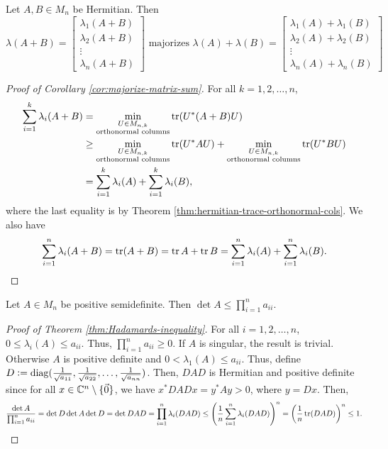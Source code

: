 \begin{corollary}
\label{cor:majorize-matrix-sum}
Let $A, B \in M_n$ be Hermitian. Then $$\lambda(A+B) = \begin{bmatrix}\lambda_1(A+B) \\ \lambda_2(A+B) \\ \vdots \\ \lambda_n(A+B)\end{bmatrix} \text{ majorizes } \lambda(A) + \lambda(B) = \begin{bmatrix}\lambda_1(A) + \lambda_1(B) \\ \lambda_2(A) + \lambda_2(B) \\ \vdots \\ \lambda_n(A) + \lambda_n(B)\end{bmatrix}$$
\end{corollary}

\begin{proof}[Proof of Corollary \ref{cor:majorize-matrix-sum}]
For all $k = 1, 2, \dots, n$,
\begin{align*}
\sum_{i=1}^k \lambda_i(A+B)
    &= \min_{\substack{U \in M_{n,k} \\ \text{orthonormal columns}}} \operatorname{tr}(U^*(A+B)U) \\
    &\geq \min_{\substack{U \in M_{n,k} \\ \text{orthonormal columns}}} \operatorname{tr}(U^*AU) +  \min_{\substack{U \in M_{n,k} \\ \text{orthonormal columns}}} \operatorname{tr}(U^*BU) \\
    &= \sum_{i=1}^k \lambda_i(A) + \sum_{i=1}^k \lambda_i(B),
\end{align*}
where the last equality is by Theorem \ref{thm:hermitian-trace-orthonormal-cols}. We also have
$$
\sum_{i=1}^n \lambda_i(A+B) = \operatorname{tr}(A+B) = \operatorname{tr} A + \operatorname{tr} B = \sum_{i=1}^n \lambda_i(A) + \sum_{i=1}^n \lambda_i(B).
$$
\end{proof}

\begin{theorem}
\label{thm:Hadamards-inequality}
Let $A \in M_n$ be positive semidefinite. Then $\det A \leq \prod_{i=1}^n a_{ii}$.
\end{theorem}
\begin{proof}[Proof of Theorem \ref{thm:Hadamards-inequality}]
For all $i = 1, 2, \dots, n$, $0 \leq \lambda_i(A) \leq a_{ii}$. Thus, $\prod_{i=1}^n a_{ii} \geq 0$. If $A$ is singular, the result is trivial. Otherwise $A$ is positive definite and $0 < \lambda_1(A) \leq a_{ii}$. Thus, define $D \vcentcolon= \operatorname{diag}(\frac{1}{\sqrt{a_{11}}}, \frac{1}{\sqrt{a_{22}}}, \dots, \frac{1}{\sqrt{a_{nn}}})$.
Then, $DAD$ is Hermitian and positive definite since for all $x \in \mathbb C^n \setminus \{\Vec{0}\}$, we have $x^*DADx = y^*Ay > 0$, where $y = Dx$. Then,
$$
\frac{\det A}{\prod_{i=1}^n a_{ii}} = \det D \det A \det D = \det DAD = \prod_{i=1}^n \lambda_i(DAD) \leq \left(\frac{1}{n}\sum_{i=1}^n \lambda_i(DAD)\right)^n = \left(\frac{1}{n}\operatorname{tr}(DAD)\right)^n \leq 1.
$$
\end{proof}